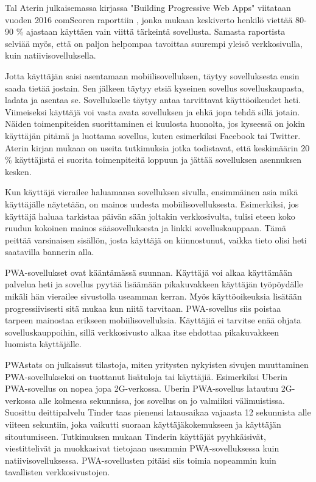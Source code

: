 \documentclass{tktltiki}
\begin{document}
Tal Aterin julkaisemassa kirjassa "Building Progressive Web Apps" \cite{ater2017building} viitataan vuoden 2016 comScoren raporttiin \cite{comScore}, jonka mukaan keskiverto henkilö viettää 80-90 \% ajastaan käyttäen vain viittä tärkeintä sovellusta. Samasta raportista selviää myös, että on paljon helpompaa tavoittaa suurempi yleisö verkkosivulla, kuin natiivisovelluksella. 

Jotta käyttäjän saisi asentamaan mobiilisovelluksen, täytyy sovelluksesta ensin saada tietää jostain. Sen jälkeen täytyy etsiä kyseinen sovellus sovelluskaupasta, ladata ja asentaa se. Sovellukselle täytyy antaa tarvittavat käyttöoikeudet heti. Viimeiseksi käyttäjä voi vasta avata sovelluksen ja ehkä jopa tehdä sillä jotain. Näiden toimenpiteiden suorittaminen ei kuulosta huonolta, jos kyseessä on jokin käyttäjän pitämä ja luottama sovellus, kuten esimerkiksi Facebook tai Twitter. Aterin kirjan mukaan \cite{ater2017building} on useita tutkimuksia jotka todistavat, että keskimäärin 20 \% käyttäjistä ei suorita toimenpiteitä loppuun ja jättää sovelluksen asennuksen kesken.

Kun käyttäjä vierailee haluamansa sovelluksen sivulla, ensimmäinen asia mikä käyttäjälle näytetään, on mainos uudesta mobiilisovelluksesta. Esimerkiksi, jos käyttäjä haluaa tarkistaa päivän sään joltakin verkkosivulta, tulisi eteen koko ruudun kokoinen mainos sääsovelluksesta ja linkki sovelluskauppaan. Tämä peittää varsinaisen sisällön, josta käyttäjä on kiinnostunut, vaikka tieto olisi heti saatavilla bannerin alla. 

PWA-sovellukset ovat kääntämässä suunnan. Käyttäjä voi alkaa käyttämään palvelua heti ja sovellus pyytää lisäämään pikakuvakkeen käyttäjän työpöydälle mikäli hän vierailee sivustolla useamman kerran. Myös käyttöoikeuksia lisätään progressiivisesti sitä mukaa kun niitä tarvitaan. PWA-sovellus siis poistaa tarpeen mainostaa erikseen mobiilisovelluksia. Käyttäjiä ei tarvitse enää ohjata sovelluskauppoihin, sillä verkkosivusto alkaa itse ehdottaa pikakuvakkeen luomista käyttäjälle. 

PWAstats \cite{PWAstats} on julkaissut tilastoja, miten yritysten nykyisten sivujen muuttaminen PWA-sovellukseksi on tuottanut lisätuloja tai käyttäjiä. Esimerkiksi Uberin PWA-sovellus on nopea jopa 2G-verkossa. Uberin PWA-sovellus latautuu 2G-verkossa alle kolmessa sekunnissa, jos sovellus on jo valmiiksi välimuistissa. Suosittu deittipalvelu Tinder taas pienensi latausaikaa vajaasta 12 sekunnista alle viiteen sekuntiin, joka vaikutti suoraan käyttäjäkokemukseen ja käyttäjän sitoutumiseen. Tutkimuksen mukaan \cite{Osmani} Tinderin käyttäjät pyyhkäisivät, viestittelivät ja muokkasivat tietojaan useammin PWA-sovelluksessa kuin natiivisovelluksessa. PWA-sovellusten pitäisi siis toimia nopeammin kuin tavallisten verkkosivustojen.
\end{document}
